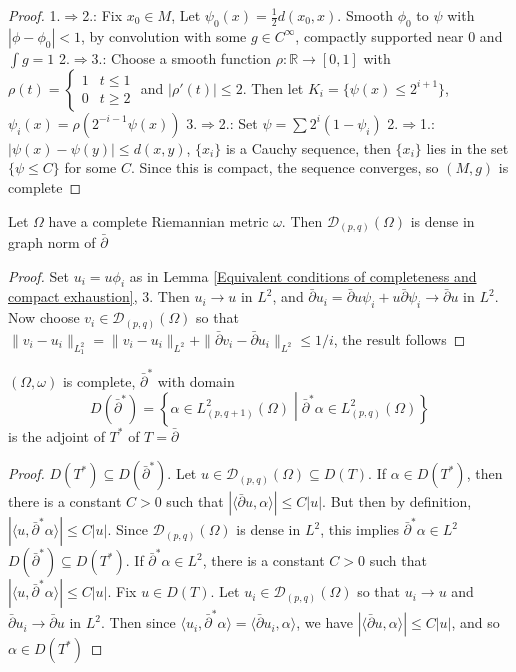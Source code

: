 \documentclass[../main.tex]{subfiles}
\begin{document}
\begin{proof}
1.$\Rightarrow$2.: Fix $x_0\in M$, Let $\psi_0(x)=\frac{1}{2}d(x_0,x)$. Smooth $\phi_0$ to $\psi$ with $|\phi-\phi_0|<1$, by convolution with some $g\in C^\infty$, compactly supported near $0$ and $\int g=1$
2.$\Rightarrow$3.: Choose a smooth function $\rho:\mathbb R\to[0,1]$ with $\rho(t)=\begin{cases}
1&t\leq1 \\
0&t\geq2
\end{cases}$ and $|\rho'(t)|\leq2$. Then let $K_i=\{\psi(x)\leq2^{i+1}\}$, $\psi_i(x)=\rho(2^{-i-1}\psi(x))$
3.$\Rightarrow$2.: Set $\psi=\sum 2^i(1-\psi_i)$
2.$\Rightarrow$1.: $|\psi(x)-\psi(y)|\leq d(x,y)$, $\{x_i\}$ is a Cauchy sequence, then $\{x_i\}$ lies in the set $\{\psi\leq C\}$ for some $C$. Since this is compact, the sequence converges, so $(M,g)$ is complete
\end{proof}

\begin{corollary}
Let $\Omega$ have a complete Riemannian metric $\omega$. Then $\mathcal D_{(p,q)}(\Omega)$ is dense in graph norm of $\bar\partial$
\end{corollary}

\begin{proof}
Set $u_i=u\phi_i$ as in Lemma \ref{Equivalent conditions of completeness and compact exhaustion}, 3. Then $u_i\to u$ in $L^2$, and $\bar\partial u_i=\bar\partial u\psi_i+u\bar\partial\psi_i\to\bar\partial u$ in $L^2$. Now choose $v_i\in\mathcal D_{(p,q)}(\Omega)$ so that $\|v_i-u_i\|_{L^2_1}=\|v_i-u_i\|_{L^2}+\|\bar\partial v_i-\bar\partial u_i\|_{L^2}\leq 1/i$, the result follows
\end{proof}

\begin{corollary}
$(\Omega,\omega)$ is complete, $\bar\partial^*$ with domain
\[D(\bar\partial^*)=\left\{\alpha\in L^2_{(p,q+1)}(\Omega)\middle|\bar\partial^*\alpha\in L^2_{(p,q)}(\Omega)\right\}\]
is the adjoint of $T^*$ of $T=\bar\partial$
\end{corollary}

\begin{proof}
$D(T^*)\subseteq D(\bar\partial^*)$. Let $u\in\mathcal D_{(p,q)}(\Omega)\subseteq D(T)$. If $\alpha\in D(T^*)$, then there is a constant $C>0$ such that $|\langle\bar\partial u,\alpha\rangle|\leq C|u|$. But then by definition, $|\langle u,\bar\partial^*\alpha\rangle|\leq C|u|$. Since $\mathcal D_{(p,q)}(\Omega)$ is dense in $L^2$, this implies $\bar\partial^*\alpha\in L^2$ \\
$D(\bar\partial^*)\subseteq D(T^*)$. If $\bar\partial^*\alpha\in L^2$, there is a constant $C>0$ such that $|\langle u,\bar\partial^*\alpha\rangle|\leq C|u|$. Fix $u\in D(T)$. Let $u_i\in\mathcal D_{(p,q)}(\Omega)$ so that $u_i\to u$ and $\bar\partial u_i\to\bar\partial u$ in $L^2$. Then since $\langle u_i,\bar\partial^*\alpha\rangle=\langle\bar\partial u_i,\alpha\rangle$, we have $|\langle\bar\partial u,\alpha\rangle|\leq C|u|$, and so $\alpha\in D(T^*)$
\end{proof}
\end{document}
